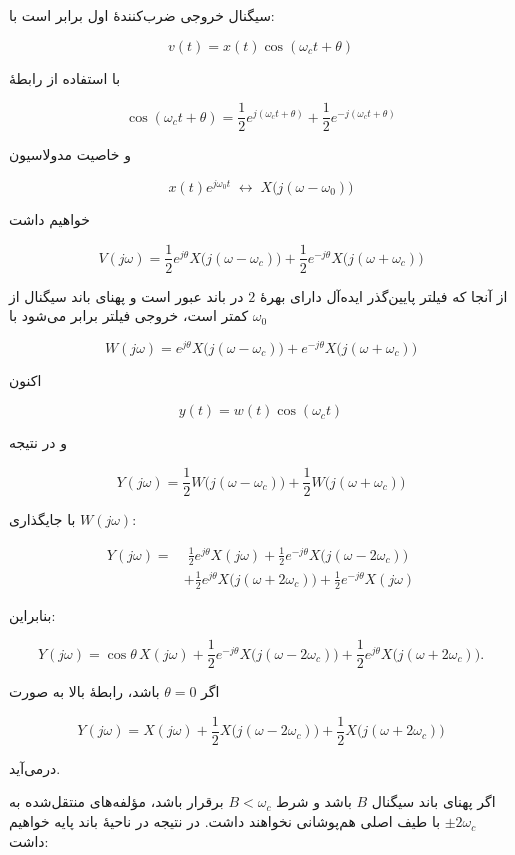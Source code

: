 
سیگنال خروجی ضرب‌کنندهٔ اول برابر است با:

\[
v(t)=x(t)\cos(\omega_c t+\theta)
\]

با استفاده از رابطهٔ

\[
\cos(\omega_c t+\theta)
=
\frac12 e^{j(\omega_c t+\theta)}
+\frac12 e^{-j(\omega_c t+\theta)}
\]

و خاصیت مدولاسیون

\[
x(t)e^{j\omega_0 t}
\;\longleftrightarrow\;
X\!\big(j(\omega-\omega_0)\big)
\]

خواهیم داشت

\[
V(j\omega)
=
\frac12 e^{j\theta}
X\!\big(j(\omega-\omega_c)\big)
+
\frac12 e^{-j\theta}
X\!\big(j(\omega+\omega_c)\big)
\]

از آنجا که فیلتر پایین‌گذر ایده‌آل دارای بهرهٔ \(2\) در باند عبور است و پهنای باند سیگنال از \(\omega_0\) کمتر است، خروجی فیلتر برابر می‌شود با

\[
W(j\omega)
=
e^{j\theta}
X\!\big(j(\omega-\omega_c)\big)
+
e^{-j\theta}
X\!\big(j(\omega+\omega_c)\big)
\]

اکنون

\[
y(t)=w(t)\cos(\omega_c t)
\]

و در نتیجه

\[
Y(j\omega)
=
\frac12
W\!\big(j(\omega-\omega_c)\big)
+
\frac12
W\!\big(j(\omega+\omega_c)\big)
\]

با جایگذاری \(W(j\omega)\):

\[
\begin{aligned}
Y(j\omega)
=&\;
\frac12 e^{j\theta}X(j\omega)
+\frac12 e^{-j\theta}X\!\big(j(\omega-2\omega_c)\big)
\\
&+
\frac12 e^{j\theta}X\!\big(j(\omega+2\omega_c)\big)
+\frac12 e^{-j\theta}X(j\omega)
\end{aligned}
\]

بنابراین:

\[
{
Y(j\omega)
=
\cos\theta\,X(j\omega)
+
\frac12 e^{-j\theta}
X\!\big(j(\omega-2\omega_c)\big)
+
\frac12 e^{j\theta}
X\!\big(j(\omega+2\omega_c)\big)
}.
\]


اگر \(\theta=0\) باشد، رابطهٔ بالا به صورت

\[
Y(j\omega)
=
X(j\omega)
+
\frac12 X\!\big(j(\omega-2\omega_c)\big)
+
\frac12 X\!\big(j(\omega+2\omega_c)\big)
\]

درمی‌آید.

اگر پهنای باند سیگنال \(B\) باشد و شرط
\(
B<\omega_c
\)
برقرار باشد، مؤلفه‌های منتقل‌شده به \(\pm 2\omega_c\) با طیف اصلی هم‌پوشانی نخواهند داشت. در نتیجه در ناحیهٔ باند پایه خواهیم داشت:

